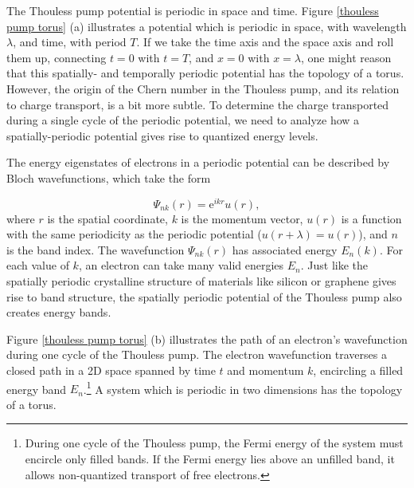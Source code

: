 \documentclass{beavtex_dub_edit}
\begin{document}
The Thouless pump potential is periodic in space and time. Figure \ref{thouless pump torus} (a) illustrates a potential which is periodic in space, with wavelength $\lambda$, and time, with period $T$. If we take the time axis and the space axis and roll them up, connecting $t = 0$ with $t = T$, and $x = 0$ with $x = \lambda$, one might reason that this spatially- and temporally periodic potential has the topology of a torus. However, the origin of the Chern number in the Thouless pump, and its relation to charge transport, is a bit more subtle. To determine the charge transported during a single cycle of the periodic potential, we need to analyze how a spatially-periodic potential gives rise to quantized energy levels.

The energy eigenstates of electrons in a periodic potential can be described by Bloch wavefunctions, which take the form

\begin{equation}
    \Psi_{nk}(r) = \mathrm{e}^{ikr}u(r), \label{Bloch's theorem}
\end{equation}
where $r$ is the spatial coordinate, $k$ is the momentum vector, $u(r)$ is a function with the same periodicity as the periodic potential ($u(r+ \lambda) = u(r)$), and $n$ is the band index. The wavefunction $\Psi_{nk}(r)$ has associated energy $E_n(k)$. For each value of $k$, an electron can take many valid energies $E_n$. Just like the spatially periodic crystalline structure of materials like silicon or graphene gives rise to band structure, the spatially periodic potential of the Thouless pump also creates energy bands.

Figure \ref{thouless pump torus} (b) illustrates the path of an electron's wavefunction during one cycle of the Thouless pump. The electron wavefunction traverses a closed path in a 2D space spanned by time $t$ and momentum $k$, encircling a filled energy band $E_n$.\footnote{During one cycle of the Thouless pump, the Fermi energy of the system must encircle only filled bands. If the Fermi energy lies above an unfilled band, it allows non-quantized transport of free electrons.} A system which is periodic in two dimensions has the topology of a torus.
\end{document}

